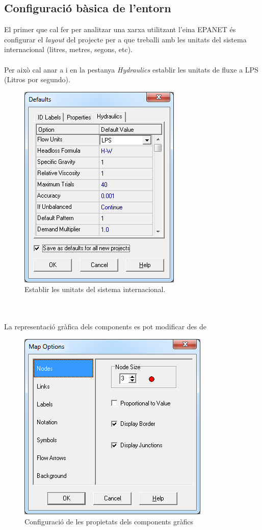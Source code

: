 \documentclass[12pt]{article}
\begin{document}
\subsection{Configuració bàsica de l'entorn}
El primer que cal fer per analitzar una xarxa utilitzant l'eina EPANET és configurar el \textit{layout} del projecte per a que treballi amb les unitats del sistema internacional (litres, metres, segons, etc).
\\\\Per això cal anar a  i en la pestanya \textit{Hydraulics} establir les unitats de fluxe a LPS (Litros por segundo).
\begin{figure}[h!]
	\centering
	\includegraphics[scale=.7]{imatges/epanet/1.png}
	\caption{Establir les unitats del sistema internacional.}
\end{figure}
\\\\La representació gràfica dels components es pot modificar des de 
\begin{figure}[h!]
	\centering
	\includegraphics[scale=.7]{imatges/epanet/2.png}
	\caption{Configuració de les propietats dels components gràfics}
\end{figure}
\end{document}
